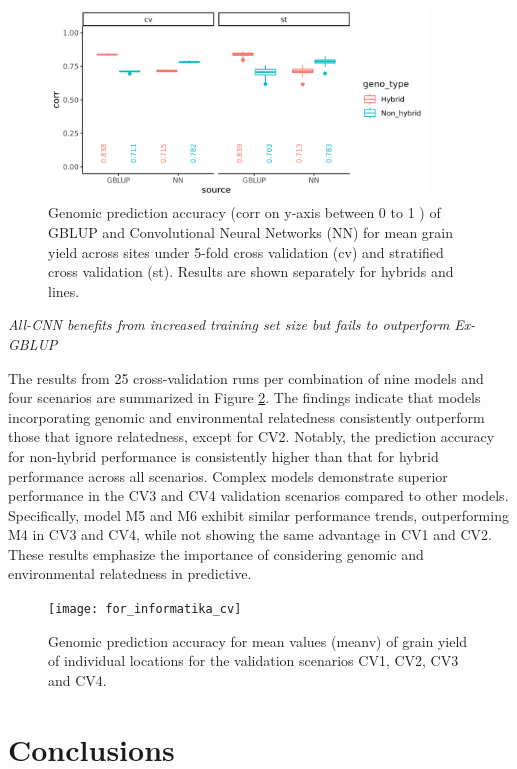 \documentclass[english, biblatex]{lni}
\begin{document}
\begin{figure}[h]
    \centering
    \includegraphics[width=0.9\textwidth]{pred_corr_res_NN_2}
    \caption{Genomic prediction accuracy (corr on y-axis between 0 to 1 ) of GBLUP and Convolutional Neural Networks (NN) for mean grain yield across sites under 5-fold cross validation (cv) and stratified cross validation (st). Results are shown separately for hybrids and lines.}
    \label{fig_pred_corr_res_NN_2}
\end{figure}

\textit{All-CNN benefits from increased training set size but fails to outperform Ex-GBLUP} 

The results from 25 cross-validation runs per combination of nine models and four scenarios are summarized in Figure \ref{fig_for_informatika_cv}. The findings indicate that models incorporating genomic and environmental relatedness consistently outperform those that ignore relatedness, except for CV2. Notably, the prediction accuracy for non-hybrid performance is consistently higher than that for hybrid performance across all scenarios. Complex models demonstrate superior performance in the CV3 and CV4 validation scenarios compared to other models. Specifically, model M5 and M6 exhibit similar performance trends, outperforming M4 in CV3 and CV4, while not showing the same advantage in CV1 and CV2. These results emphasize the importance of considering genomic and environmental relatedness in predictive.

\begin{figure}[h]
    \centering
    \texttt{[image: for\_informatika\_cv]}
    \caption{Genomic prediction accuracy for mean values (mean{\textunderscore}v) of grain yield of individual locations for the validation scenarios CV1, CV2, CV3 and CV4.}
    \label{fig_for_informatika_cv}
\end{figure}

\section{Conclusions}
\end{document}
